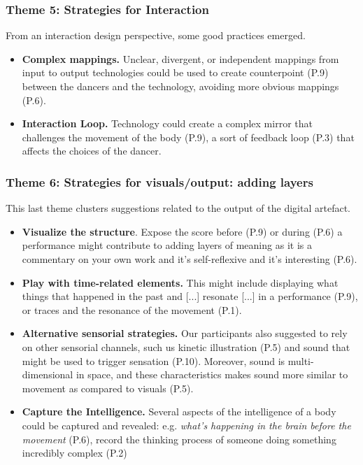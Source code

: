 \subsubsection{Theme 5: Strategies for Interaction}

From an interaction design perspective, some good practices emerged.

\begin{itemize}
\item \textbf{Complex mappings.} Unclear, divergent, or independent mappings from input to output technologies could be used to create counterpoint (P.9) between the dancers and the technology, avoiding more obvious mappings (P.6).
\item \textbf{Interaction Loop.} Technology could create a complex mirror that challenges the movement of the body (P.9), a sort of feedback loop (P.3) that affects the choices of the dancer.
\end{itemize}

\subsubsection{Theme 6: Strategies for visuals/output: adding layers}

This last theme clusters suggestions related to the output of the digital artefact.

\begin{itemize}
\item \textbf{Visualize the structure}. Expose the score before (P.9) or during (P.6) a performance might contribute to adding layers of meaning as it is a commentary on your own work and it’s self-reflexive and it’s interesting (P.6).
\item \textbf{Play with time-related elements.} This might include displaying what things that happened in the past and [...] resonate [...] in a performance (P.9), or traces and the resonance of the movement (P.1).
\item \textbf{Alternative sensorial strategies.} Our participants also suggested to rely on other sensorial channels, such us kinetic illustration (P.5) and sound that might be used to trigger sensation (P.10). Moreover, sound is multi-dimensional in space, and these characteristics makes sound more similar to movement as compared to visuals (P.5).
\item \textbf{Capture the Intelligence.} Several aspects of the intelligence of a body could be captured and revealed: e.g. \textit{what’s happening in the brain before the movement} (P.6), record the thinking process of someone doing something incredibly complex (P.2)
\end{itemize}

